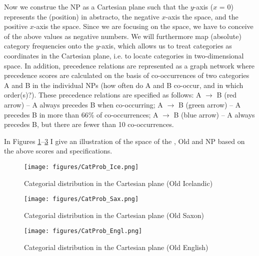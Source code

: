 \documentclass[output=paper,colorlinks,citecolor=brown,draft]{langscibook}
\begin{document}
Now we construe the NP as a Cartesian plane such that the $y$-axis ($x$ = 0) represents the  (position) in abstracto, the negative $x$-axis the  space, and the positive $x$-axis   the  space. Since we are focusing on the  space, we have to conceive of the above values as negative numbers.  We will furthermore map (absolute) category frequencies onto the $y$-axis, which allows us to treat categories as coordinates in the Cartesian plane, i.e. to locate categories in two-dimensional space. In addition, precedence relations are represented as a graph network where precedence scores are calculated on the basis of co-occurrences of two categories A and B in the individual NPs (how often do A and B co-occur, and in which order(s)?). These precedence relations are specified as follows: A {\color{red}$\rightarrow$} B (red arrow) -- A always precedes B when co-occurring; A {\color{green}$\rightarrow$} B (green arrow) -- A precedes B in more than 66\% of co-occurrences; A {\color{cyan}$\rightarrow$} B (blue arrow) -- A always precedes B, but there are fewer than 10 co-occurrences.

In Figures \ref{fig:catprobICE}--\ref{fig:catprobENG} I give an illustration of the  space of the , Old  and  NP based on the above scores and specifications. 

\vfill
\begin{figure}[H]
\caption{Categorial distribution in the Cartesian plane (Old Icelandic)}
\texttt{[image: figures/CatProb\_Ice.png]}
\label{fig:catprobICE}
\end{figure}
\vfill\pagebreak

\begin{figure}[p]
\caption{Categorial distribution in the Cartesian plane (Old Saxon)}
\texttt{[image: figures/CatProb\_Sax.png]}
\label{fig:catprobSAX}
\end{figure}

\begin{figure}[p]
\caption{Categorial distribution in the Cartesian plane (Old English)}
\texttt{[image: figures/CatProb\_Engl.png]}
\label{fig:catprobENG}
\end{figure}
\end{document}
